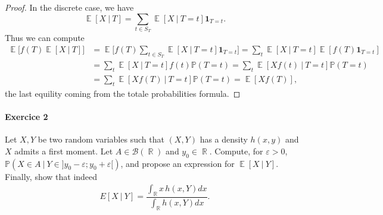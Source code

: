 \documentclass[10pt,a4paper]{article}
\theoremstyle{definition}
\numberwithin{equation}{section}
\DeclareMathOperator{\R}{\mathbb{R}}
\DeclareMathOperator{\E}{\mathbb{E}}
\begin{document}
\begin{proof}
In the discrete case, we have
$$\E[X~|~T] = \sum_{t\in S_T} \E[X~|~T=t]\mathbf{1}_{T=t}.$$ 
Thus we can compute
\begin{align*}
\E\big[ f(T) \E[X~|~T]\big] &= \E\big[ f(T) \sum_{t\in S_T} \E[X~|~T=t]\mathbf{1}_{T=t} \big] = \sum_t \E[X~|~T=t]\E[f(T) \mathbf{1}_{T=t}]\\
&= \sum_t \E[X~|~T=t]f(t)\mathbb{P}(T=t) = \sum_t \E[Xf(t)~|~T=t]\mathbb{P}(T=t)\\
&= \sum_t \E[Xf(T)~|~T=t]\mathbb{P}(T=t) = \E[Xf(T)],
\end{align*}
the last equility coming from the totale probabilities formula.
\end{proof}


\paragraph{Exercice 2}
Let $X,Y$ be two random variables such that $(X,Y)$ has a density $h(x,y)$ and $X$ admits a first moment. Let $A \in \mathcal{B}(\R)$ and $y_0\in\R$. Compute, for $\varepsilon>0$, 
$\mathbb{P}(X\in A~|~Y\in ]y_0-\varepsilon;y_0+\varepsilon[)$, and propose an expression for $\E[X~|~Y]$.\\
Finally, show that indeed
\begin{align}
\label{CE_density}
E[X~|~Y] = \dfrac{\int_{\R} x \, h(x,Y)dx}{\int_{\R} h(x,Y)dx}.
\end{align}
\end{document}
